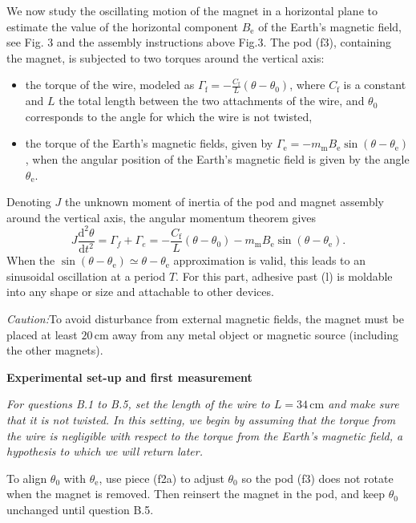 We now study the oscillating motion of the magnet in a horizontal plane to
estimate the value of the horizontal component $B_\mathrm{e}$ of the Earth's
magnetic field, see Fig. 3 and the assembly instructions above Fig.3. The pod
(f3), containing the magnet, is subjected to two torques around the vertical
axis:
\begin{itemize}
\item the torque of the wire, modeled as
$\varGamma_\mathrm{f} = -\frac{C_\mathrm{f}}{L}(\theta - \theta_0)$, where
$C_\mathrm{f}$ is a constant and $L$ the total length between the two
attachments of the wire, and $\theta_0$ corresponds to the angle for which the
wire is not twisted,
\item the torque of the Earth’s magnetic fields, given by
$\varGamma_\mathrm{e} = -m_\mathrm{m}B_\mathrm{e}\sin(\theta - \theta_\mathrm{e})$,
when the angular position of the Earth's magnetic field is given by the angle
$\theta_\mathrm{e}$.
\end{itemize}
Denoting $J$ the unknown moment of inertia of the pod and magnet assembly
around the vertical axis, the angular momentum theorem gives
\begin{equation}
J\frac{\mathrm{d}^2\theta}{\mathrm{d}t^2} = \varGamma_f + \varGamma_e
= -\frac{C_\mathrm{f}}{L}(\theta - \theta_0)
- m_\mathrm{m}B_\mathrm{e}\sin(\theta - \theta_\mathrm{e}). \tag{4}
\end{equation}
When the $\sin(\theta - \theta_\mathrm{e}) \simeq \theta - \theta_\mathrm{e}$
approximation is valid, this leads to an sinusoidal oscillation at a period
$T$. For this part, adhesive past (l) is moldable into any shape or size and
attachable to other devices.

\textit{Caution:}\quad To avoid disturbance from external magnetic fields, the
magnet must be placed at least $20\,\mathrm{cm}$ away from any metal object or
magnetic source (including the other magnets).

\textbf{Experimental set-up and first measurement}

\textit{For questions B.1 to B.5, set the length of the wire to
$L = 34\,\mathrm{cm}$ and make sure that it is not twisted. In this setting, we
begin by assuming that the torque from the wire is negligible with respect to
the torque from the Earth's magnetic field, a hypothesis to which we will
return later.}

To align $\theta_0$ with $\theta_\mathrm{e}$, use piece (f2a) to adjust
$\theta_0$ so the pod (f3) does not rotate when the magnet is removed. Then
reinsert the magnet in the pod, and keep $\theta_0$ unchanged until question
B.5.

